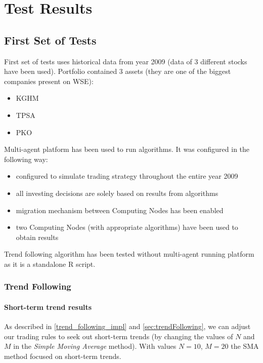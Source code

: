 \chapter{Test Results}
\label{cha:pierwszyDokument}

\section{First Set of Tests}

First set of tests uses historical data from year 2009 (data of 3 different stocks have been used). 
Portfolio contained 3 assets (they are one of the biggest companies present on WSE):

\begin{itemize} 
  \item KGHM
  \item TPSA
  \item PKO
\end{itemize}

Multi-agent platform has been used to run algorithms.
It was configured in the following way: 

\begin{itemize}
  \item configured to simulate trading strategy throughout the entire year 2009
  \item all investing decisions are solely based on results from algorithms
  \item migration mechanism between Computing Nodes has been enabled
  \item two Computing Nodes (with appropriate algorithms) have been used to obtain results
\end{itemize}

Trend following algorithm has been tested without multi-agent running platform as it is a standalone R script.

\subsection{Trend Following}

\subsubsection{Short-term trend results}

As described in \ref{trend_following_impl} and \ref{sec:trendFollowing}, we can adjust our trading rules to seek out short-term trends
 (by changing the values of $N$ and $M$ in the \emph{Simple Moving Average} method).
With values $N = 10$, $M = 20$ the SMA method focused on short-term trends.
 

